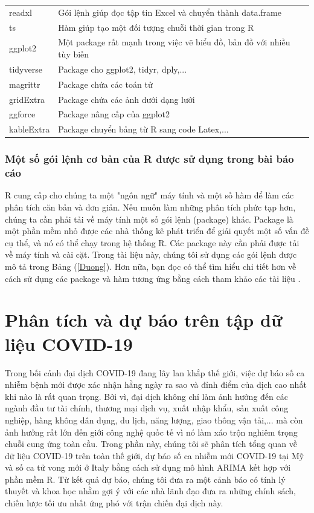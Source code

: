 \documentclass[12pt, a4paper,oneside]{book}
\theoremstyle{definition}
\begin{document}
\begin{longtable}{p{3.2cm}p{11cm}}
	readxl & Gói lệnh giúp đọc tập tin Excel và chuyển thành data.frame \\
	\rowcolor{gray!6} ts  & Hàm giúp tạo một đối tượng chuỗi thời gian trong R \\
	ggplot2 & Một package rất mạnh trong việc vẽ biểu đồ, bản đồ với nhiều tùy biến\\
	\rowcolor{gray!6} tidyverse& Package cho ggplot2, tidyr,  dply,...\\
    magrittr & Package chứa các toán tử\\
    \rowcolor{gray!6}gridExtra & Package chứa các ảnh dưới dạng lưới\\
    ggforce&  Package nâng cấp của ggplot2\\
    \rowcolor{gray!6} kableExtra &Package chuyển bảng từ R sang code Latex,... \\
	\bottomrule
\end{longtable}
\endgroup{} 
\subsubsection*{Một số gói lệnh cơ bản của R được sử dụng trong bài báo cáo}
R cung cấp cho chúng ta một "ngôn ngữ" máy tính và một số hàm để làm các phân tích căn bản và đơn giản. Nếu muốn làm những phân tích phức tạp hơn, chúng ta cần phải tải về máy tính một số gói lệnh (package) khác. Package là một phần mềm nhỏ được các nhà thống kê phát triển để giải quyết một số vấn đề cụ thể, và nó có thể chạy trong hệ thống R. Các package này cần phải được tải về máy tính và cài cặt. Trong tài liệu này, chúng tôi sử dụng các gói lệnh được mô tả trong Bảng (\ref{Duong}). Hơn nữa, bạn đọc có thể tìm hiểu chi tiết hơn về cách sử dụng các package và hàm tương ứng bằng cách tham khảo các tài liệu \cite{3, 6, 7, 8}.
\section{Phân tích và dự báo trên tập dữ liệu COVID-19}
Trong bối cảnh đại dịch COVID-19 đang lây lan khắp thế giới, việc dự báo số ca nhiễm bệnh mới được xác nhận hằng ngày ra sao và đỉnh điểm của dịch cao nhất khi nào là rất quan trọng. Bởi vì, đại dịch không chỉ làm ảnh hưởng đến các ngành đầu tư tài chính, thương mại dịch vụ, xuất nhập khẩu, sản xuất công nghiệp, hàng không dân dụng, du lịch, năng lượng, giao thông vận tải,... mà còn ảnh hưởng rất lớn đến giới công nghệ quốc tế vì nó làm xáo trộn nghiêm trọng chuỗi cung ứng toàn cầu. Trong phần này, chúng tôi sẽ phân tích tổng quan về dữ liệu COVID-19 trên toàn thế giới, dự báo số ca nhiễm mới COVID-19 tại Mỹ và số ca tử vong mới ở Italy bằng cách sử dụng mô hình ARIMA kết hợp với phần mềm R. Từ kết quả dự báo, chúng tôi đưa ra một cảnh báo có tính lý thuyết và khoa học nhằm gợi ý với các nhà lãnh đạo đưa ra những chính sách, chiến lược tối ưu nhất ứng phó với trận chiến đại dịch này.
\end{document}
